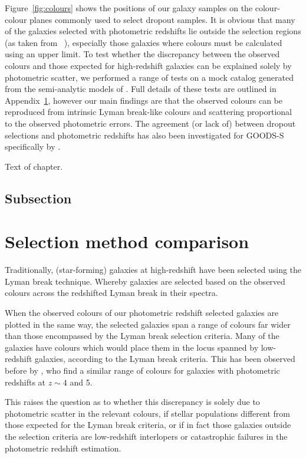 Figure~\ref{fig:colours} shows the positions of our galaxy samples on the colour-colour planes commonly used to select dropout samples. It is obvious that many of the galaxies selected with photometric redshifts lie outside the selection regions (as taken from \citeauthor{2007ApJ...670..928B}~\citeyear{2007ApJ...670..928B}), especially those galaxies where colours must be calculated using an upper limit. To test whether the discrepancy between the observed colours and those expected for high-redshift galaxies can be explained solely by photometric scatter, we performed a range of tests on a mock catalog generated from the semi-analytic models of \citep{Somerville:2008ed}. Full details of these tests are outlined in Appendix~\ref{app:selection}, however our main findings are that the observed colours can be reproduced from intrinsic Lyman break-like colours and scattering proportional to the observed photometric errors. The agreement (or lack of) between dropout selections and photometric redshifts has also been investigated for GOODS-S specifically by \citet{2010ApJ...724..425D}.

Text of chapter.  

\subsection[Subsec]{Subsection}
\label{sec:subsec2_label}

\section{Selection method comparison}\label{app:selection}
Traditionally, (star-forming) galaxies at high-redshift have been selected using the Lyman break technique. Whereby galaxies are selected based on the observed colours across the redshifted Lyman break in their spectra.

When the observed colours of our photometric redshift selected galaxies are plotted in the same way, the selected galaxies span a range of colours far wider than those encompassed by the Lyman break selection criteria. Many of the galaxies have colours which would place them in the locus spanned by low-redshift galaxies, according to the Lyman break criteria. This has been observed before by \citet{2010ApJ...724..425D}, who find a similar range of colours for galaxies with photometric redshifts at $z \sim 4$ and 5.

This raises the question as to whether this discrepancy is solely due to photometric scatter in the relevant colours, if stellar populations different from those expected for the Lyman break criteria, or if in fact those galaxies outside the selection criteria are low-redshift interlopers or catastrophic failures in the photometric redshift estimation.

